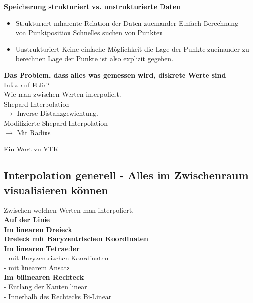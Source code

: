 \documentclass{article}
\begin{document}
\noindent \textbf{Speicherung strukturiert vs. unstrukturierte Daten}
\begin{itemize}[noitemsep]
	\item Strukturiert
	\subitem inhärente Relation der Daten zueinander
	\subitem Einfach Berechnung von Punktposition
	\subitem Schnelles suchen von Punkten
	\item Unstrukturiert
	\subitem Keine einfache Möglichkeit die Lage der Punkte zueinander zu berechnen
	\subitem Lage der Punkte ist also explizit gegeben.
\end{itemize}

\noindent \textbf{Das Problem, dass alles was gemessen wird, diskrete Werte sind}\\
Infos auf Folie?\\
Wie man zwischen Werten interpoliert.\\

\noindent Shepard Interpolation\\
$\rightarrow$ Inverse Distanzgewichtung.\\

\noindent Modifizierte Shepard Interpolation\\
$\rightarrow$ Mit Radius

\noindent Ein Wort zu VTK


\subsection{Interpolation generell - Alles im Zwischenraum visualisieren können }
Zwischen welchen Werten man interpoliert.\\

\noindent \textbf{Auf der Linie}\\

\noindent \textbf{Im linearen Dreieck}\\

\noindent \textbf{Dreieck mit Baryzentrischen Koordinaten}\\

\noindent \textbf{Im linearen Tetraeder}\\
- mit Baryzentrischen Koordinaten\\
- mit linearem Ansatz\\

\noindent \textbf{Im bilinearen Rechteck}\\
- Entlang der Kanten linear\\
- Innerhalb des Rechtecks Bi-Linear\\
\end{document}
